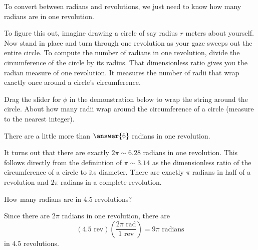 \documentclass{ximera}
\begin{document}
\begin{exploration}  \label{E33:Angles}
To convert between radians and revolutions, we just need to know how many radians are in one revolution.





To figure this out, imagine drawing a circle of say radius $r$ meters about yourself. Now stand in place and turn through one revolution as your gaze sweeps out the entire circle. To compute the number of radians in one revolution, divide the circumference of the circle by its radius. That dimensionless ratio gives you the radian measure of one revolution. It measures the number of radii that wrap exactly once around a circle's circumference.


\begin{question}
Drag the slider for $\phi$ in the demonstration below to wrap the string around the circle. About how many radii wrap around the circumference of a circle (measure to the nearest integer). 

There are a little more than $\answer{6}$ radians in one revolution.

\end{question}

It turns out that there are exactly $2\pi \sim 6.28$ radians in one revolution. This follows directly from the definintion of $\pi \sim 3.14$ as the dimensionless ratio of the circumference of a circle to its diameter. There are exactly $\pi$ radians in half of a revolution and $2\pi$ radians in a complete revolution.


 
\begin{onlineOnly}
    \begin{center}
\end{center}
\end{onlineOnly}
\end{exploration}


\begin{question}  \label{Q43:Angles}
How many radians are in 4.5 revolutions?

\begin{explanation}
Since there are $2\pi$ radians in one revolution, there are 
\[
   (4.5 \text{ rev})  \left( \frac{2\pi \text{ rad}}{1 \text{ rev}}  \right)  = 9\pi \text{ radians} 
\]
in $4.5$ revolutions.
\end{explanation}
\end{question}
\end{document}

